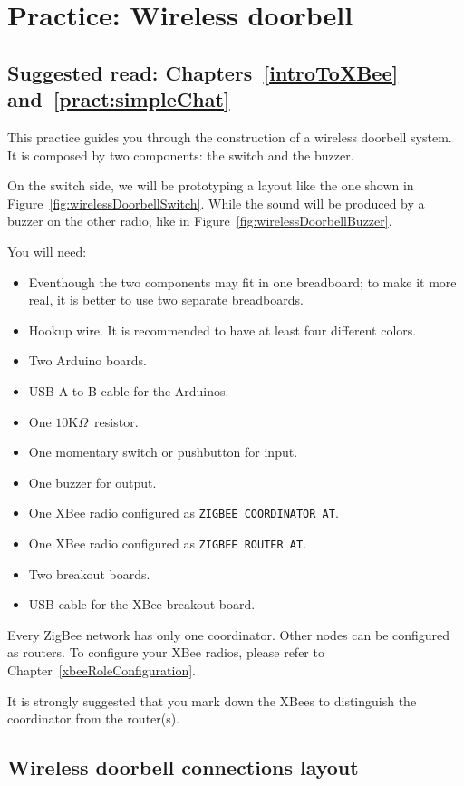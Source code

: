\chapter{Practice: Wireless doorbell}\label{pract:wirelessDoorbell}
\section*{Suggested read: Chapters~\ref{introToXBee} and~\ref{pract:simpleChat}}

This practice guides you through the construction of a wireless doorbell system. It is composed by two components: the switch and the buzzer.

On the switch side, we will be prototyping a layout like the one shown in Figure~\ref{fig:wirelessDoorbellSwitch}. While the sound will be produced by a buzzer on the other radio, like in Figure~\ref{fig:wirelessDoorbellBuzzer}.

You will need:

\begin{itemize}
  \item Eventhough the two components may fit in one breadboard; to make it more real, it is better to use two separate breadboards.
  \item Hookup wire. It is recommended to have at least four different colors.
  \item Two Arduino boards.
  \item USB A-to-B cable for the Arduinos.
  \item One $10$K$\Omega$~resistor.
  \item One momentary switch or pushbutton for input.
  \item One buzzer for output.
  \item One XBee radio configured as \texttt{ZIGBEE COORDINATOR AT}.
  \item One XBee radio configured as \texttt{ZIGBEE ROUTER AT}.
  \item Two breakout boards.
  \item USB cable for the XBee breakout board.
\end{itemize}

Every ZigBee network has only one coordinator. Other nodes can be configured as routers. To configure your XBee radios, please refer to Chapter~\ref{xbeeRoleConfiguration}.

It is strongly suggested that you mark down the XBees to distinguish the coordinator from the router(s).

\section{Wireless doorbell connections layout}

